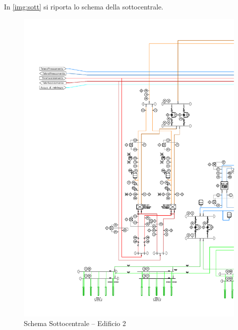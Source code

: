 In \vref{img:sott} si riporta lo schema della sottocentrale.

%
\begin{figure}
	\centering
	\includegraphics[width=\textwidth]{6_4_cap/img/sottocentr}
	\caption{Schema Sottocentrale -- Edificio 2}
	\label{img:sott}
\end{figure}
